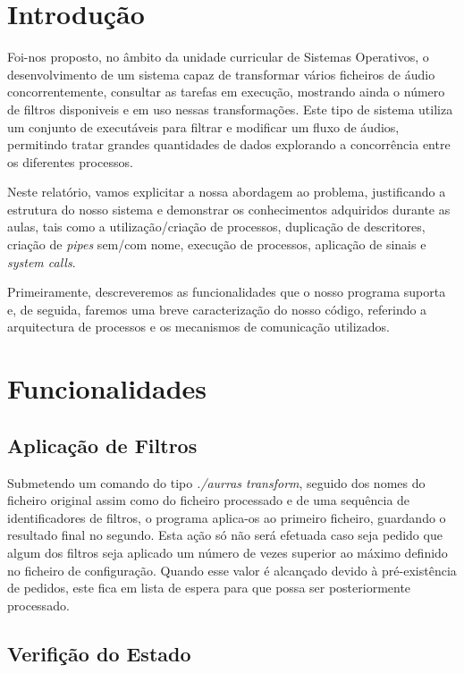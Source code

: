 \documentclass[11pt,a4paper]{report}
\begin{document}
\tableofcontents %

\chapter{Introdução}

Foi-nos proposto, no âmbito da unidade curricular de Sistemas Operativos, o desenvolvimento de um sistema capaz de transformar vários ficheiros de áudio concorrentemente, consultar as tarefas em execução, mostrando ainda o número de filtros disponiveis e em uso nessas transformações. Este tipo de sistema utiliza um conjunto de executáveis para filtrar e modificar um fluxo de áudios, permitindo tratar grandes quantidades de dados explorando a concorrência entre os diferentes processos.

Neste relatório, vamos explicitar a nossa abordagem ao problema, justificando a estrutura do nosso sistema e demonstrar os conhecimentos adquiridos durante as aulas, tais como a utilização/criação de processos, duplicação de descritores, criação de \emph{pipes} sem/com nome, execução de processos, aplicação de sinais e \emph{system calls}.

Primeiramente, descreveremos as funcionalidades que o nosso programa suporta e, de seguida, faremos uma breve caracterização do nosso código, referindo a arquitectura de processos e os mecanismos de comunicação utilizados.

\chapter{Funcionalidades}

\section{Aplicação de Filtros}

Submetendo um comando do tipo \emph{./aurras transform}, seguido dos nomes do ficheiro original assim como do ficheiro processado e de uma sequência de identificadores de filtros, o programa aplica-os ao primeiro ficheiro, guardando o resultado final no segundo. Esta ação só não será efetuada caso seja pedido que algum dos filtros seja aplicado um número de vezes superior ao máximo definido no ficheiro de configuração. Quando esse valor é alcançado devido à pré-existência de pedidos, este fica em lista de espera para que possa ser posteriormente processado.

\section{Verifição do Estado}
\end{document}
